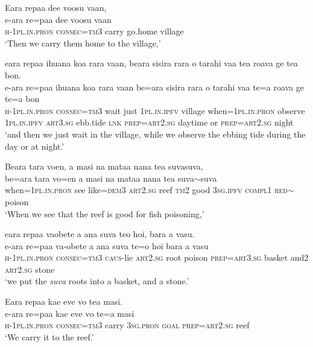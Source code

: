 \newpage
\ea\label{ex:text30-6}
Eara repaa dee voosu vaan,\\
\gll e-ara	re=paa	dee	voosu	vaan\\
     \textsc{h}-1\textsc{pl}.\textsc{in}.\textsc{pron}	\textsc{consec}=\textsc{tm}3	carry	go.home	village\\
\glt `Then we carry them home to the village,'
\z

\ea\label{ex:text30-7}
eara repaa ihuana koa rara vaan, beara sisira rara o tarahi vaa tea roava ge tea bon.\\
\gll e-ara	re=paa	ihuana	koa	rara	vaan	be=ara	sisira	rara	o	tarahi	vaa	te=a	roava	ge	te=a	bon\\
     \textsc{h}-1\textsc{pl}.\textsc{in}.\textsc{pron}	\textsc{consec}=\textsc{tm}3	wait	just	1\textsc{pl}.\textsc{in}.\textsc{ipfv}	village	when=1\textsc{pl}.\textsc{in}.\textsc{pron}	observe	1\textsc{pl}.\textsc{in}.\textsc{ipfv}	\textsc{art}3.\textsc{sg}	ebb.tide	\textsc{lnk}	\textsc{prep}=\textsc{art}2.\textsc{sg}	daytime	or	\textsc{prep}=\textsc{art}2.\textsc{sg}	night\\
\glt `and then we just wait in the village, while we observe the ebbing tide during the day or at night.'
\z

\ea\label{ex:text30-8}
Beara tara voen, a masi na mataa nana tea suvasuva,\\
\gll be=ara	tara	vo=en	a	masi	na	mataa	nana	tea	suva{$\sim$}suva\\
     when=1\textsc{pl}.\textsc{in}.\textsc{pron}	see	like=\textsc{dem}3	\textsc{art}2.\textsc{sg}	reef	\textsc{tm}2	good	3\textsc{sg}.\textsc{ipfv}	\textsc{compl}1	\textsc{red}{$\sim$}poison\\
\glt `When we see that the reef is good for fish poisoning,'
\z

\ea\label{ex:text30-9}
eara repaa vaobete a ana suva teo hoi, bara a vasu.\\
\gll e-ara	re=paa	va-obete	a	ana	suva	te=o	hoi	bara	a	vasu\\
     \textsc{h}-1\textsc{pl}.\textsc{in}.\textsc{pron}	\textsc{consec}=\textsc{tm}3	\textsc{caus}-lie	\textsc{art}2.\textsc{sg}	root	poison	\textsc{prep}=\textsc{art}3.\textsc{sg}	basket	and2	\textsc{art}2.\textsc{sg}	stone\\
\glt `we put the \textit{suva} roots into a basket, and a stone.'
\z

\ea\label{ex:text30-10}
Eara repaa kae eve vo tea masi.\\
\gll e-ara	re=paa	kae	eve	vo	te=a	masi\\
     \textsc{h}-1\textsc{pl}.\textsc{in}.\textsc{pron}	\textsc{consec}=\textsc{tm}3	carry	3\textsc{sg}.\textsc{pron}	\textsc{goal}	\textsc{prep}=\textsc{art}2.\textsc{sg}	reef\\
\glt `We carry it to the reef.'
\z

